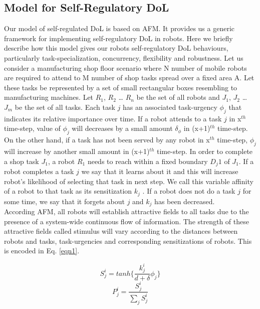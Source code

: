 \documentclass[letterpaper, 10 pt, conference]{ieeeconf}  %
\begin{document}
\subsection{Model for Self-Regulatory DoL}
Our model of self-regulated DoL is based on AFM. It provides us a generic framework for implementing self-regulatory DoL in robots. Here we briefly describe how this model gives our robots self-regulatory DoL behaviours, particularly task-specialization, concurrency, flexibility and robustness.
Let us consider a manufacturing shop floor scenario where N number of mobile robots are required to attend to M number of shop tasks spread over a fixed area A. Let these tasks be represented by a set of small rectangular boxes resembling to manufacturing machines. Let $R_1$, $R_2$ … $R_n$ be the set of all robots and $J_1$, $J_2$ … $J_m$ be the set of all tasks. Each task $j$ has an associated task-urgency $\phi_j$ that indicates its relative importance over time. If a robot attends to a task $j$ in x$^{th}$ time-step, value of $\phi_j$ will decreases by a small amount $\delta_\phi$ in (x+1)$^{th}$ time-step. On the other hand, if a task has not been served by any robot in x$^{th}$ time-step,  $\phi_j$  will increase by another small amount in (x+1)$^{th}$ time-step. In order to complete a shop task $J_1$, a robot $R_1$ needs to reach within a fixed boundary $D_j1$ of $J_1$. If a robot completes a task $j$ we say that it learns about it and this will increase robot's likelihood of selecting that task in next step. We call this variable affinity of a robot to that task as its sensitization $k_j$ . If a robot does not do a task $j$ for some time, we say that it forgets about $j$ and $k_j$ has been decreased.\\
According AFM, all robots will establish attractive fields to all tasks due to the presence of a system-wide continuous flow of information. The strength of these attractive fields called stimulus will vary according to the distances between robots and tasks, task-urgencies and corresponding  sensitizations of robots. This is encoded in Eq. \ref{eqn1}.
\begin{small}
\begin{equation}
S_{j}^{i} = tanh\{\frac{k_{j}^{i}}{d+\delta } \phi _{j}\}
\label{eqn1}
\end{equation}
\begin{equation}
P_{j}^{i} = \frac{S_{j}^{i}}{\sum_{j}^{}S_{j}^{i}}
\label{eqn2}
\end{equation}
\end{small}
\end{document}
